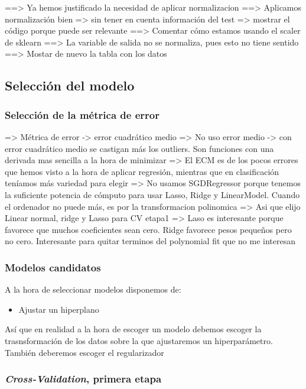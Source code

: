 \documentclass[11pt]{article}
\begin{document}
==> Ya hemos justificado la necesidad de aplicar normalizacion
==> Aplicamos normalización bien => sin tener en cuenta información del test => mostrar el código porque puede ser relevante
==> Comentar cómo estamos usando el scaler de sklearn
==> La variable de salida no se normaliza, pues esto no tiene sentido
==> Mostar de nuevo la tabla con los datos

\subsection{Selección del modelo}

\subsubsection{Selección de la métrica de error}

=> Métrica de error -> error cuadrático medio
=> No uso error medio -> con error cuadrático medio se castigan más los outliers. Son funciones con una derivada mas sencilla a la hora de minimizar
=> El ECM es de los pocos errores que hemos visto a la hora de aplicar regresión, mientras que en clasificación teníamos más variedad para elegir
=> No usamos SGDRegressor porque tenemos la suficiente potencia de cómputo para usar Lasso, Ridge y LinearModel. Cuando el ordenador no puede más, es por la transformacion polinomica
=> Asi que elijo Linear normal, ridge y Lasso para CV etapa1
    => Laso es interesante porque favorece que muchos coeficientes sean cero. Ridge favorece pesos pequeños pero no cero. Interesante para quitar terminos del polynomial fit que no me interesan

\subsubsection{Modelos candidatos}

A la hora de seleccionar modelos disponemos de:

\begin{itemize}
    \item Ajustar un hiperplano
\end{itemize}

Así que en realidad a la hora de escoger un modelo debemos escoger la trasnsformación de los datos sobre la que ajustaremos un hiperparámetro. También deberemos escoger el regularizador

\subsubsection{\emph{Cross-Validation}, primera etapa}
\end{document}
